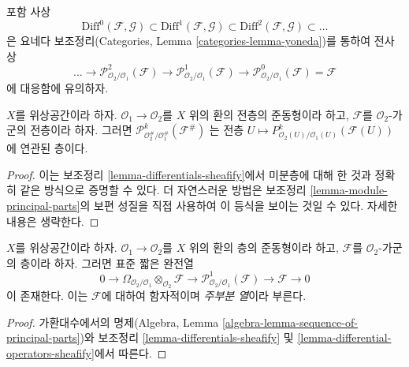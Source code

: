 \noindent
포함 사상
$$
\text{Diff}^0(\mathcal{F}, \mathcal{G}) \subset
\text{Diff}^1(\mathcal{F}, \mathcal{G}) \subset
\text{Diff}^2(\mathcal{F}, \mathcal{G}) \subset \ldots
$$
은 요네다 보조정리(Categories, Lemma \ref{categories-lemma-yoneda})를
통하여 전사상
$$
\ldots \to \mathcal{P}^2_{\mathcal{O}_2/\mathcal{O}_1}(\mathcal{F})
\to \mathcal{P}^1_{\mathcal{O}_2/\mathcal{O}_1}(\mathcal{F})
\to \mathcal{P}^0_{\mathcal{O}_2/\mathcal{O}_1}(\mathcal{F}) = \mathcal{F}
$$
에 대응함에 유의하자.

\begin{lemma}
\label{lemma-differential-operators-sheafify}
$X$를 위상공간이라 하자. $\mathcal{O}_1 \to \mathcal{O}_2$를
$X$ 위의 환의 전층의 준동형이라 하고, $\mathcal{F}$를
$\mathcal{O}_2$-가군의 전층이라 하자. 그러면
$\mathcal{P}^k_{\mathcal{O}_2^\#/\mathcal{O}_1^\#}(\mathcal{F}^\#)$
는 전층 $U \mapsto P^k_{\mathcal{O}_2(U)/\mathcal{O}_1(U)}(\mathcal{F}(U))$에
연관된 층이다.
\end{lemma}

\begin{proof}
이는 보조정리 \ref{lemma-differentials-sheafify}에서 미분층에 대해 한 것과
정확히 같은 방식으로 증명할 수 있다. 더 자연스러운 방법은 보조정리
\ref{lemma-module-principal-parts}의 보편 성질을 직접 사용하여 이 등식을
보이는 것일 수 있다. 자세한 내용은 생략한다.
\end{proof}

\begin{lemma}
\label{lemma-sequence-of-principal-parts}
$X$를 위상공간이라 하자. $\mathcal{O}_1 \to \mathcal{O}_2$를
$X$ 위의 환의 층의 준동형이라 하고, $\mathcal{F}$를
$\mathcal{O}_2$-가군의 층이라 하자. 그러면 표준 짧은 완전열
$$
0 \to
\Omega_{\mathcal{O}_2/\mathcal{O}_1} \otimes_{\mathcal{O}_2} \mathcal{F} \to
\mathcal{P}^1_{\mathcal{O}_2/\mathcal{O}_1}(\mathcal{F}) \to
\mathcal{F} \to 0
$$
이 존재한다. 이는 $\mathcal{F}$에 대하여 함자적이며
{\it 주부분 열}이라 부른다.
\end{lemma}

\begin{proof}
가환대수에서의 명제(Algebra, Lemma
\ref{algebra-lemma-sequence-of-principal-parts})와 보조정리
\ref{lemma-differentials-sheafify} 및
\ref{lemma-differential-operators-sheafify}에서 따른다.
\end{proof}

